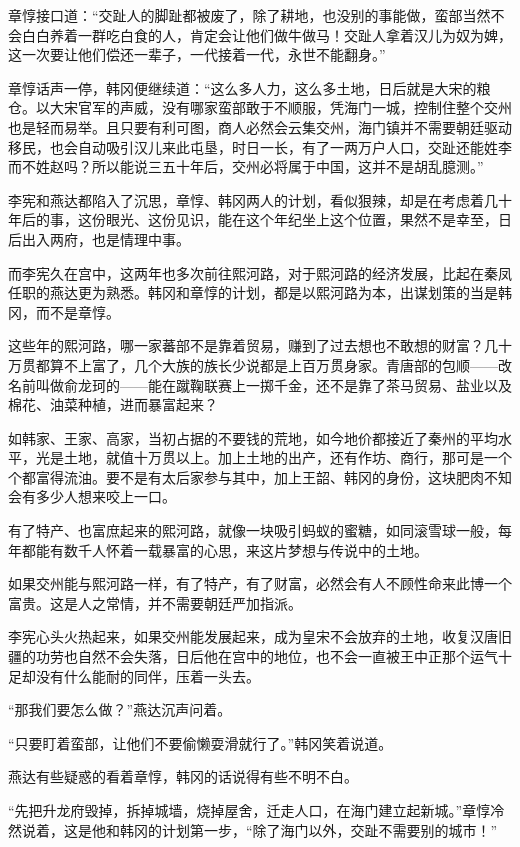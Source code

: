 章惇接口道：“交趾人的脚趾都被废了，除了耕地，也没别的事能做，蛮部当然不会白白养着一群吃白食的人，肯定会让他们做牛做马！交趾人拿着汉儿为奴为婢，这一次要让他们偿还一辈子，一代接着一代，永世不能翻身。”

章惇话声一停，韩冈便继续道：“这么多人力，这么多土地，日后就是大宋的粮仓。以大宋官军的声威，没有哪家蛮部敢于不顺服，凭海门一城，控制住整个交州也是轻而易举。且只要有利可图，商人必然会云集交州，海门镇并不需要朝廷驱动移民，也会自动吸引汉儿来此屯垦，时日一长，有了一两万户人口，交趾还能姓李而不姓赵吗？所以能说三五十年后，交州必将属于中国，这并不是胡乱臆测。”

李宪和燕达都陷入了沉思，章惇、韩冈两人的计划，看似狠辣，却是在考虑着几十年后的事，这份眼光、这份见识，能在这个年纪坐上这个位置，果然不是幸至，日后出入两府，也是情理中事。

而李宪久在宫中，这两年也多次前往熙河路，对于熙河路的经济发展，比起在秦凤任职的燕达更为熟悉。韩冈和章惇的计划，都是以熙河路为本，出谋划策的当是韩冈，而不是章惇。

这些年的熙河路，哪一家蕃部不是靠着贸易，赚到了过去想也不敢想的财富？几十万贯都算不上富了，几个大族的族长少说都是上百万贯身家。青唐部的包顺——改名前叫做俞龙珂的——能在蹴鞠联赛上一掷千金，还不是靠了茶马贸易、盐业以及棉花、油菜种植，进而暴富起来？

如韩家、王家、高家，当初占据的不要钱的荒地，如今地价都接近了秦州的平均水平，光是土地，就值十万贯以上。加上土地的出产，还有作坊、商行，那可是一个个都富得流油。要不是有太后家参与其中，加上王韶、韩冈的身份，这块肥肉不知会有多少人想来咬上一口。

有了特产、也富庶起来的熙河路，就像一块吸引蚂蚁的蜜糖，如同滚雪球一般，每年都能有数千人怀着一载暴富的心思，来这片梦想与传说中的土地。

如果交州能与熙河路一样，有了特产，有了财富，必然会有人不顾性命来此博一个富贵。这是人之常情，并不需要朝廷严加指派。

李宪心头火热起来，如果交州能发展起来，成为皇宋不会放弃的土地，收复汉唐旧疆的功劳也自然不会失落，日后他在宫中的地位，也不会一直被王中正那个运气十足却没有什么能耐的同伴，压着一头去。

“那我们要怎么做？”燕达沉声问着。

“只要盯着蛮部，让他们不要偷懒耍滑就行了。”韩冈笑着说道。

燕达有些疑惑的看着章惇，韩冈的话说得有些不明不白。

“先把升龙府毁掉，拆掉城墙，烧掉屋舍，迁走人口，在海门建立起新城。”章惇冷然说着，这是他和韩冈的计划第一步，“除了海门以外，交趾不需要别的城市！”


